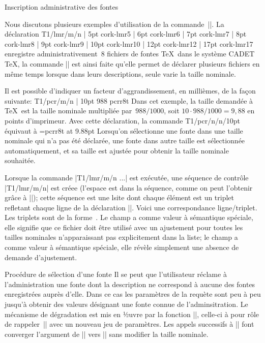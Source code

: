 \formalpar Inscription administrative des fontes

Nous discutons plusieurs exemples d'utilisation de la
commande~|\fontmatch|. La déclaration
\begincode
\fontmatch T1/lmr/m/n \with
|  5pt cork-lmr5
|  6pt cork-lmr6
|  7pt cork-lmr7
|  8pt cork-lmr8
|  9pt cork-lmr9
| 10pt cork-lmr10
| 12pt cork-lmr12
| 17pt cork-lmr17
\stop
\endcode
enregistre administrativement~$8$ fichiers de fontes \TeX\ dans le
système CADET \TeX, la commande |\fontmatch| est ainsi faite qu'elle
permet de déclarer plusieurs fichiers en même temps lorsque dans leurs
descriptions, seule varie la taille nominale.

Il est possible d'indiquer un facteur d'aggrandissement, en millièmes,
de la façon suivante:
\begincode
\fontmatch T1/pcr/m/n \with
| 10pt 988 pcrr8t
\stop
\endcode
Dans cet exemple, la taille demandée à \TeX\ est la taille nominale
multipliée par~$988/1000$, soit $10 \cdot 988/1000 = 9,88$ en points
d'imprimeur. Avec cette déclaration, la commande
\begincode
\fontwish T1/pcr/n/n/10pt\as\courierten
\endcode
équivaut à
\begincode
\font\courierten=pcrr8t at 9.88pt
\endcode
Lorsqu'on sélectionne une fonte dans une taille nominale qui n'a pas
été déclarée, une fonte dans autre taille est sélectionnée
automatiquement, et sa taille est ajustée pour obtenir la taille
nominale souhaitée.

Lorsque la commande |\fontmatch T1/lmr/m/n \with...| est exécutée, une
séquence de contrôle |\fontmatch T1/lmr/m/n| est créee (l'espace est
dans la séquence, comme on peut l'obtenir grâce à |\csname|); cette
séquence est une lsite dont chaque élément est un triplet refletant
chaque ligne de la déclaration |\fontmatch|. Voici une correspondance
ligne/triplet.
\begindisplay
{}
\enddisplay
Les triplets sont de la
forme~. Le champ
 a \li{0pt} comme valeur à sémantique spéciale,
elle signifie que ce fichier  doit être utilisé avec un
ajustement pour toutes les tailles nominales n'apparaissant pas
explicitement dans la liste; le champ  a  comme
valeur à sémantique spéciale, elle révèle simplement une absence
de demande d'ajustement.

\formalpar Procédure de sélection d'une fonte
Il se peut que l'utilisateur réclame à l'administration une fonte dont
la description ne correspond à aucune des fontes enregistrées auprès
d'elle. Dans ce cas les paramètres de la requète sont 
peu à peu jusqu'à obtenir des valeurs désignant une fonte connue de
l'adminsitration. Le mécanisme de dégradation est mis en ½uvre par la
fonction |\fontwish@Y|, celle-ci à pour rôle de rappeler~|\fontwish@A|
avec un nouveau jeu de paramètres. Les appels successifs à
|\fontwish@Y| font converger l'argument de |\fontwish@A| vers
|| sans modifier la taille nominale.

